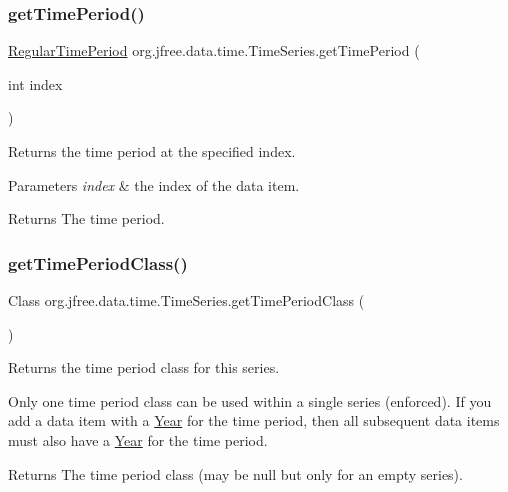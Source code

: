 \subsubsection{\texorpdfstring{get\+Time\+Period()}{getTimePeriod()}}
{\footnotesize\ttfamily \mbox{\hyperlink{classorg_1_1jfree_1_1data_1_1time_1_1_regular_time_period}{Regular\+Time\+Period}} org.\+jfree.\+data.\+time.\+Time\+Series.\+get\+Time\+Period (\begin{DoxyParamCaption}\item[{int}]{index }\end{DoxyParamCaption})}

Returns the time period at the specified index.


\begin{DoxyParams}{Parameters}
{\em index} & the index of the data item.\\
\hline
\end{DoxyParams}
\begin{DoxyReturn}{Returns}
The time period. 
\end{DoxyReturn}
\mbox{\label{classorg_1_1jfree_1_1data_1_1time_1_1_time_series_a2915da3eb3aa085103b543773e7d91f5}} 
\subsubsection{\texorpdfstring{get\+Time\+Period\+Class()}{getTimePeriodClass()}}
{\footnotesize\ttfamily Class org.\+jfree.\+data.\+time.\+Time\+Series.\+get\+Time\+Period\+Class (\begin{DoxyParamCaption}{ }\end{DoxyParamCaption})}

Returns the time period class for this series. 

Only one time period class can be used within a single series (enforced). If you add a data item with a \mbox{\hyperlink{classorg_1_1jfree_1_1data_1_1time_1_1_year}{Year}} for the time period, then all subsequent data items must also have a \mbox{\hyperlink{classorg_1_1jfree_1_1data_1_1time_1_1_year}{Year}} for the time period.

\begin{DoxyReturn}{Returns}
The time period class (may be {\ttfamily null} but only for an empty series). 
\end{DoxyReturn}
\mbox{\label{classorg_1_1jfree_1_1data_1_1time_1_1_time_series_a15f14354046115a1ddbf479eaf6192fb}} 
